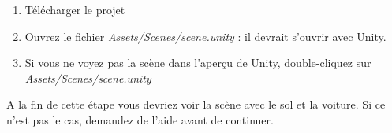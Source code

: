 
\begin{enumerate}
\item Télécharger le projet
\item Ouvrez le fichier \textit{Assets/Scenes/scene.unity} : il devrait s'ouvrir avec Unity.
\item Si vous ne voyez pas la scène dans l'aperçu de Unity, double-cliquez sur \textit{Assets/Scenes/scene.unity}
\end{enumerate}

A la fin de cette étape vous devriez voir la scène avec le sol et la voiture. Si ce n'est pas le cas, demandez de l'aide avant de continuer.